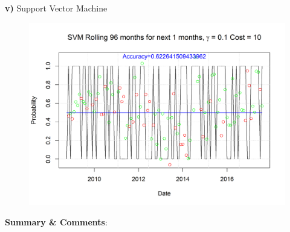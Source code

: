 \documentclass[12pt]{amsart}
\begin{document}
\textbf{v)} Support Vector Machine\\

\begin{figure}[htb]
	\includegraphics[scale=0.9]{IYW_SVM_rolling_penalize}
\end{figure}


\newpage

\vskip 8pt \noindent
{\textbf{Summary \& Comments}: }
\vskip 8pt \noindent
\end{document}
